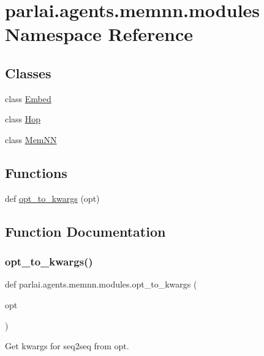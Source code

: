\hypertarget{namespaceparlai_1_1agents_1_1memnn_1_1modules}{}\section{parlai.\+agents.\+memnn.\+modules Namespace Reference}
\label{namespaceparlai_1_1agents_1_1memnn_1_1modules}
\subsection*{Classes}
\begin{DoxyCompactItemize}
\item 
class \hyperlink{classparlai_1_1agents_1_1memnn_1_1modules_1_1Embed}{Embed}
\item 
class \hyperlink{classparlai_1_1agents_1_1memnn_1_1modules_1_1Hop}{Hop}
\item 
class \hyperlink{classparlai_1_1agents_1_1memnn_1_1modules_1_1MemNN}{Mem\+NN}
\end{DoxyCompactItemize}
\subsection*{Functions}
\begin{DoxyCompactItemize}
\item 
def \hyperlink{namespaceparlai_1_1agents_1_1memnn_1_1modules_a2c4bbfc9a0eb3220cd85bb8dd94b147c}{opt\+\_\+to\+\_\+kwargs} (opt)
\end{DoxyCompactItemize}


\subsection{Function Documentation}
\mbox{\label{namespaceparlai_1_1agents_1_1memnn_1_1modules_a2c4bbfc9a0eb3220cd85bb8dd94b147c}} 
\subsubsection{\texorpdfstring{opt\+\_\+to\+\_\+kwargs()}{opt\_to\_kwargs()}}
{\footnotesize\ttfamily def parlai.\+agents.\+memnn.\+modules.\+opt\+\_\+to\+\_\+kwargs (\begin{DoxyParamCaption}\item[{}]{opt }\end{DoxyParamCaption})}

\begin{DoxyVerb}Get kwargs for seq2seq from opt.
\end{DoxyVerb}
 